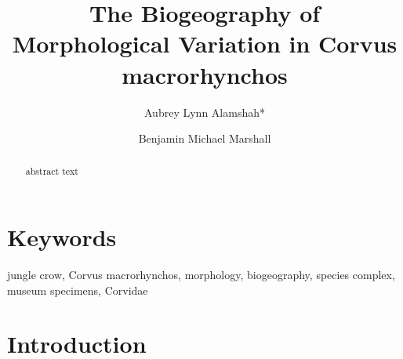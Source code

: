 \documentclass[10pt,a4paper]{article}
\begin{document}
\pagestyle{fancy}

\title{The Biogeography of Morphological Variation in Corvus macrorhynchos}
\author[1]{Aubrey Lynn Alamshah*}
\author[2]{Benjamin Michael Marshall}

\maketitle
\thispagestyle{fancy}

\begin{abstract}

abstract text

\end{abstract}

\section*{Keywords}

jungle crow, Corvus macrorhynchos, morphology, biogeography, species complex, museum specimens, Corvidae

\clearpage
\pagestyle{fancy}

\section{Introduction}\label{introduction}
\end{document}
